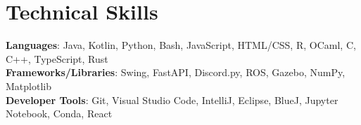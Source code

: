 \documentclass[letterpaper,11pt]{article}
\begin{document}
%
\section{Technical Skills}
\begin{itemize}[leftmargin=0.15in, label={}]
  \small{\item{
                \textbf{Languages}{: Java, Kotlin, Python, Bash, JavaScript, HTML/CSS, R, OCaml, C, C++, TypeScript, Rust} \\
                \textbf{Frameworks/Libraries}{: Swing, FastAPI, Discord.py, ROS, Gazebo, NumPy, Matplotlib} \\
                \textbf{Developer Tools}{: Git, Visual Studio Code, IntelliJ, Eclipse, BlueJ, Jupyter Notebook, Conda, React}
          }}
\end{itemize}


\end{document}
